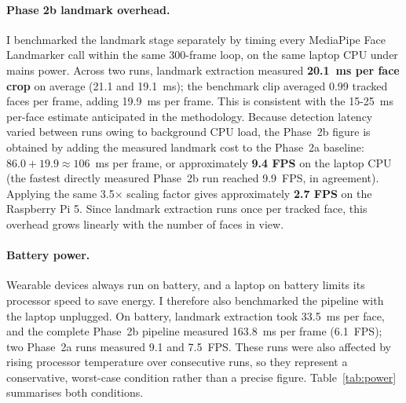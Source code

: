 \paragraph{Phase 2b landmark overhead.}
I benchmarked the landmark stage separately by timing every MediaPipe Face
Landmarker call within the same 300-frame loop, on the same laptop CPU under mains
power. Across two runs, landmark extraction measured \textbf{20.1~ms per face crop}
on average (21.1 and 19.1~ms); the benchmark clip averaged 0.99 tracked faces per
frame, adding 19.9~ms per frame. This is consistent with the 15-25~ms per-face
estimate anticipated in the methodology. Because detection latency varied between
runs owing to background CPU load, the Phase~2b figure is obtained by adding the
measured landmark cost to the Phase~2a baseline: $86.0 + 19.9 \approx 106$~ms per
frame, or approximately \textbf{9.4 FPS} on the laptop CPU (the fastest directly
measured Phase~2b run reached 9.9~FPS, in agreement). Applying the same
3.5$\times$ scaling factor gives approximately \textbf{2.7 FPS} on the Raspberry
Pi 5. Since landmark extraction runs once per tracked face, this overhead grows
linearly with the number of faces in view.

\paragraph{Battery power.}
Wearable devices always run on battery, and a laptop on battery limits its processor
speed to save energy. I therefore also benchmarked the pipeline with the laptop
unplugged. On battery, landmark extraction took
33.5~ms per face, and the complete Phase~2b pipeline measured 163.8~ms per frame
(6.1~FPS); two Phase~2a runs measured 9.1 and 7.5~FPS. These runs were also
affected by rising processor temperature over consecutive runs, so they represent a
conservative, worst-case condition rather than a precise figure.
Table~\ref{tab:power} summarises both conditions.

\begin{table}[htbp]
\begin{singlespace}
\centering
\caption{Measured laptop CPU throughput under mains and battery power, with the
projected Raspberry Pi 5 throughput (3.5$\times$ scaling factor). Battery figures are
single runs affected by rising processor temperature.}
\label{tab:power}
\renewcommand{\arraystretch}{1.3}
\end{singlespace}
\end{table}

